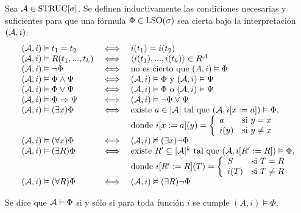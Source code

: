 \begin{definition}
\label{semantica_def}
Sea $\mathcal{A} \in \text{STRUC}[\sigma]$.
Se definen inductivamente las condiciones necesarias y suficientes para que 
una fórmula $\Phi \in \text{LSO}(\sigma)$ sea cierta bajo la interpretación $(\mathcal{A}, i)$:
\[
\begin{array}{lcl}
(\mathcal{A}, i) \vDash t_1 = t_2 & \iff & i(t_1) = i(t_2)\\
(\mathcal{A}, i) \vDash R(t_1,...,t_{k}) & \iff & \langle i(t_1),...,i(t_{k}) \rangle \in R^{\mathcal{A}}\\
(\mathcal{A}, i) \vDash \neg \Phi & \iff & \mbox{no es cierto que } (A, i) \vDash \Phi\\
(\mathcal{A}, i) \vDash \Phi \land \Psi & \iff & (\mathcal{A}, i) \vDash \Phi \mbox{ y } (\mathcal{A}, i) \vDash \Psi\\
(\mathcal{A}, i) \vDash \Phi \lor \Psi & \iff & (\mathcal{A}, i) \vDash \Phi \mbox{ o } (\mathcal{A}, i) \vDash \Psi\\
(\mathcal{A}, i) \vDash \Phi \Rightarrow \Psi & \iff & (\mathcal{A}, i) \vDash \neg \Phi \lor \Psi\\
(\mathcal{A}, i) \vDash (\exists x) \Phi & \iff & \mbox{existe } a \in |\mathcal{A}| 
\mbox{ tal que } (\mathcal{A}, i [x:= a]) \vDash \Phi,\\
&&\mbox{donde } i[x:=a](y) = \left\{
     \begin{array}{lr}
       a & \mbox{si } y = x\\
       i(y) & \mbox{si } y \not= x
     \end{array}
   \right.\\
(\mathcal{A}, i) \vDash (\forall x) \Phi & \iff &
    (\mathcal{A}, i) \nvDash (\exists x) \neg \Phi\\
(\mathcal{A}, i) \vDash (\exists R) \Phi & \iff & \mbox{existe } R' \subseteq |\mathcal{A}|^k
\mbox{ tal que } (\mathcal{A}, i[R':=R]) \vDash \Phi,\\
&&\mbox{donde } i[R':=R](T) = \left\{
     \begin{array}{lr}
       S & \mbox{si } T = R\\
       i(T) & \mbox{si } T \not= R
     \end{array}
   \right.\\
(\mathcal{A}, i) \vDash (\forall R) \Phi & \iff &
    (\mathcal{A}, i) \nvDash (\exists R) \neg \Phi\\
\end{array}
\]
\end{definition}
\begin{definition}
\label{semantica_def2}
Se dice que $\mathcal{A} \vDash \Phi$ si y sólo si para toda función $i$ se cumple $(A, i)
\models \Phi$.
\end{definition}

